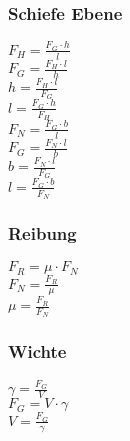 \subsubsection{Schiefe Ebene} 
\begin{minipage}{0.45\textwidth} 
$ F_{H}  = \frac{F_{G} \cdot h}{ l} $\\ 
$ F_{G}  = \frac{F_{H} \cdot l}{ h} $\\ 
$ h = \frac{F_{H} \cdot l}{ F_{G} } $\\ 
$ l = \frac{F_{G} \cdot h}{ F_{H} } $\\ 
$ F_{N}  = \frac{F_{G} \cdot b}{ l} $\\ 
$ F_{G}  = \frac{F_{N} \cdot l}{ b} $\\ 
$ b = \frac{F_{N} \cdot l}{ F_{G} } $\\ 
$ l = \frac{F_{G} \cdot b}{ F_{N} } $\\ 
\end{minipage} 
\begin{minipage}{0.45\textwidth} 
 
\end{minipage} 
\subsubsection{Reibung} 
\begin{minipage}{0.45\textwidth} 
$ F_{R}  = \mu \cdot F_{N} $\\ 
$ F_{N}  = \frac{F_{R} }{\mu } $\\ 
$ \mu  = \frac{F_{R} }{F_{N} } $\\ 
\end{minipage} 
\begin{minipage}{0.45\textwidth} 
 
\end{minipage} 
\subsubsection{Wichte} 
\begin{minipage}{0.45\textwidth} 
$ \gamma  = \frac{F_{G} }{V} $\\ 
$ F_{G}  = V\cdot \gamma $\\ 
$ V = \frac{F_{G} }{\gamma } $\\ 
\end{minipage} 
\begin{minipage}{0.45\textwidth} 
 
\end{minipage} 
